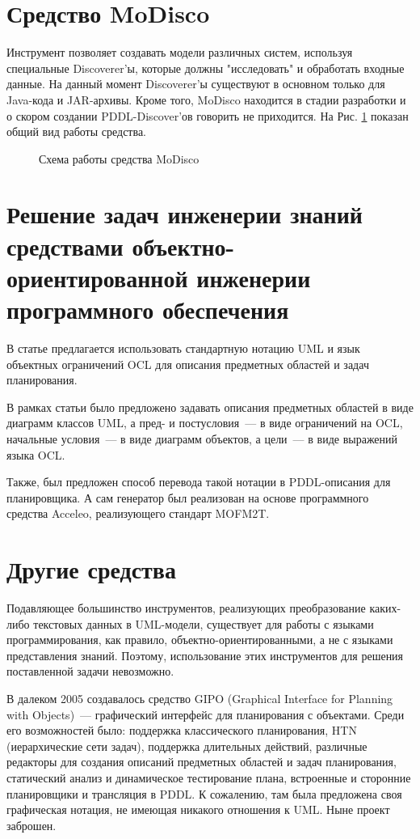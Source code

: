     
\section{Средство MoDisco}
    Инструмент позволяет создавать модели различных систем, используя специальные Discoverer'ы, которые должны "исследовать" и обработать входные данные.
 На данный момент   Discoverer'ы существуют в основном только для Java-кода и JAR-архивы.
 Кроме того, MoDisco находится в стадии разработки и о скором создании PDDL-Discover'ов говорить не приходится.
 На  Рис. \ref{img:modisco_overview} показан общий вид работы средства.
    
    \begin{figure}[h]
        \caption{Схема работы средства MoDisco}
        \label{img:modisco_overview}

    \end{figure}    

\section{Решение задач инженерии знаний средствами объектно-ориентированной  инженерии программного обеспечения}    

В статье \cite{mal-manz} предлагается использовать стандартную нотацию UML и язык объектных ограничений OCL для описания предметных областей и задач планирования.

В рамках статьи было предложено задавать описания предметных областей в виде диаграмм классов UML, а пред- и постусловия~--- в виде ограничений на OCL, начальные условия~--- в виде диаграмм объектов, а цели~--- в виде выражений языка OCL.
 
Также, был предложен способ перевода такой нотации в PDDL-описания для планировщика.
 А сам генератор был реализован на основе программного средства Acceleo, реализующего стандарт MOFM2T\cite{mofm2t}.
 
    
\section{Другие средства}
     Подавляющее большинство инструментов, реализующих преобразование каких-либо текстовых данных в UML-модели, существует для работы с языками программирования, как правило, объектно-ориентированными, а не с языками представления знаний.
 Поэтому, использование этих инструментов для решения поставленной задачи невозможно.
  
    
    В далеком 2005 создавалось средство GIPO (Graphical Interface for Planning with Objects)\cite{gipo}~--- графический интерфейс для планирования с объектами.
 Среди его возможностей было: поддержка классического планирования, HTN (иерархические  сети задач), поддержка длительных действий, различные редакторы для создания описаний предметных областей и задач планирования, статический анализ и динамическое тестирование плана, встроенные и сторонние планировщики и трансляция в PDDL.
 К сожалению, там была предложена своя графическая нотация, не имеющая никакого отношения к UML.
 Ныне проект заброшен.
   
\newpage